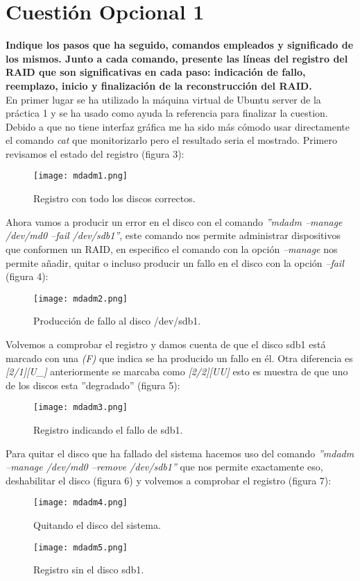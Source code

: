 \documentclass[a4paper, 11pt]{article} %
\begin{document}
\pagebreak

\section{Cuestión Opcional 1}
\textbf{Indique los pasos que ha seguido, comandos empleados y significado de los mismos. Junto a cada comando, presente las líneas del registro del RAID que son significativas en cada paso: indicación de fallo, reemplazo, inicio y finalización de la reconstrucción del RAID.}\\

\cite{5} En primer lugar se ha utilizado la máquina virtual de Ubuntu server de la práctica 1 y se ha usado como ayuda la referencia \cite{6} \cite{7} para finalizar la cuestion. Debido a que no tiene interfaz gráfica me ha sido más cómodo usar directamente el comando \textit{cat} que monitorizarlo pero el resultado seria el mostrado. Primero revisamos el estado del registro (figura 3):
\begin{figure}[H]
\centering 
\texttt{[image: mdadm1.png]} 
\caption{Registro con todo los discos correctos.} 
\label{contexto:figura} 
\end{figure}
Ahora vamos a producir un error en el disco con el comando \textit{''mdadm --manage /dev/md0 --fail /dev/sdb1''}, este comando nos permite administrar dispositivos que conformen un RAID, en especifico el comando con la opción \textit{--manage} nos permite añadir, quitar o incluso producir un fallo en el disco con la opción \textit{--fail} (figura 4):
\begin{figure}[H]
\centering 
\texttt{[image: mdadm2.png]} 
\caption{Producción de fallo al disco /dev/sdb1.} 
\label{contexto:figura} 
\end{figure}

\pagebreak

Volvemos a comprobar el registro y damos cuenta de que el disco sdb1 está marcado con una \textit{(F)} que indica se ha producido un fallo en él. Otra diferencia es \textit{[2/1][U\_]} anteriormente se marcaba como \textit{[2/2][UU]} esto es muestra de que uno de los discos esta ''degradado'' (figura 5):
\begin{figure}[H]
\centering 
\texttt{[image: mdadm3.png]} 
\caption{Registro indicando el fallo de sdb1.} 
\label{contexto:figura} 
\end{figure}
Para quitar el disco que ha fallado del sistema hacemos uso del comando \textit{''mdadm --manage /dev/md0 --remove /dev/sdb1''} que nos permite exactamente eso, deshabilitar el disco (figura 6) y volvemos a comprobar el registro (figura 7):
\begin{figure}[H]
\centering 
\texttt{[image: mdadm4.png]} 
\caption{Quitando el disco del sistema.} 
\label{contexto:figura} 
\end{figure}
\begin{figure}[H]
\centering 
\texttt{[image: mdadm5.png]} 
\caption{Registro sin el disco sdb1.} 
\label{contexto:figura} 
\end{figure}
\end{document}
